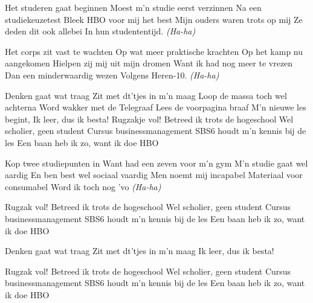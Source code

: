 \begin{verse*}
Het studeren gaat beginnen
Moest m'n studie eerst verzinnen
Na een studiekeuzetest
Bleek HBO voor mij het best
Mijn ouders waren trots op mij
Ze deden dit ook allebei
In hun studententijd. \textit{(Ha-ha)}
\end{verse*}

\begin{verse*}
Het corps zit vast te wachten
Op wat meer praktische krachten
Op het kamp nu aangekomen
Hielpen zij mij uit mijn dromen
Want ik had nog meer te vrezen
Dan een minderwaardig wezen
Volgens Heren-10. \textit{(Ha-ha)}
\end{verse*}

\begin{chorus}
Denken gaat wat traag
Zit met dt'tjes in m'n maag
Loop de massa toch wel achterna
Word wakker met de Telegraaf
Lees de voorpagina braaf
M'n nieuwe les begint,
Ik leer, dus ik besta!
Rugzakje vol!
Betreed ik trots de hogeschool
Wel scholier, geen student
Cursus businessmanagement
SBS6 houdt m'n kennis bij de les
Een baan heb ik zo, want ik doe HBO
\end{chorus}

\begin{verse*}
Kop twee studiepunten in
Want had een zeven voor m'n gym
M'n studie gaat wel aardig
En ben best wel sociaal vaardig
Men noemt mij incapabel
Materiaal voor consumabel
Word ik toch nog 'vo \textit{(Ha-ha)}
\end{verse*}

\thechorus

\begin{verse*}
Rugzak vol!
Betreed ik trots de hogeschool
Wel scholier, geen student
Cursus businessmanagement
SBS6 houdt m'n kennis bij de les
Een baan heb ik zo, want ik doe HBO
\end{verse*}

\begin{verse*}
Denken gaat wat traag
Zit met dt'tjes in m'n maag
Ik leer, dus ik besta!
\end{verse*}

\begin{verse*}
Rugzak vol!
Betreed ik trots de hogeschool
Wel scholier, geen student
Cursus businessmanagement
SBS6 houdt m'n kennis bij de les
Een baan heb ik zo, want ik doe HBO
\end{verse*}
